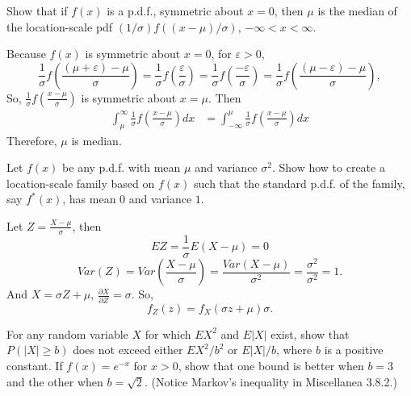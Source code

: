 \documentclass[14pt]{elegantbook}
\begin{document}
    \setcounter{exer}{36}
    \begin{exercise}
        Show that if $f(x)$ is a p.d.f., symmetric about $x=0$, then $\mu$ is the median of the location-scale pdf $(1/\sigma)f((x-\mu)/\sigma)$, $-\infty<x<\infty$. 
    \end{exercise}

    \begin{solution}
        Because $f(x)$ is symmetric about $x=0$, for $\varepsilon>0$, 
        \[
            \frac{1}{\sigma}f\left(\frac{(\mu+\varepsilon)-\mu}{\sigma}\right)=\frac{1}{\sigma}f\left(\frac{\varepsilon}{\sigma}\right)=\frac{1}{\sigma}f\left(\frac{-\varepsilon}{\sigma}\right)=\frac{1}{\sigma}f\left(\frac{(\mu-\varepsilon)-\mu}{\sigma}\right), 
        \]
        So, $\frac{1}{\sigma}f\left(\frac{x-\mu}{\sigma}\right)$ is symmetric about $x=\mu$. Then
        \begin{align*}
            \int_\mu^\infty \frac{1}{\sigma}f\left(\frac{x-\mu}{\sigma}\right)dx&=\int_{-\infty}^\mu \frac{1}{\sigma}f\left(\frac{x-\mu}{\sigma}\right)dx
        \end{align*}
        Therefore, $\mu$ is median. 
    \end{solution}

    \setcounter{exer}{39}
    \begin{exercise}
        Let $f(x)$ be any p.d.f. with mean $\mu$ and variance $\sigma^2$. Show how to create a location-scale family based on $f(x)$ such that the standard p.d.f. of the family, say $f^*(x)$, has mean $0$ and variance $1$.
    \end{exercise}

    \begin{solution}
        Let $Z=\frac{X-\mu}{\sigma}$, then
        \[EZ=\frac{1}{\sigma}E(X-\mu)=0\]
        \[Var(Z)=Var\left(\frac{X-\mu}{\sigma}\right)=\frac{Var(X-\mu)}{\sigma^2}=\frac{\sigma^2}{\sigma^2}=1. \]
        And $X=\sigma Z+\mu$, $\frac{\partial X}{\partial Z}=\sigma$. So, 
        \[
            f_Z(z)=f_X(\sigma z+\mu)\sigma. 
        \]
    \end{solution}

    \setcounter{exer}{43}
    \begin{exercise}
        For any random variable $X$ for which $EX^2$ and $E|X|$ exist, show that $P(|X|\geq b)$ does not exceed either $EX^2/b^2$ or $E|X|/b$, where $b$ is a positive constant. If $f(x)=e^{-x}$ for $x>0$, show that one bound is better when $b=3$ and the other when $b=\sqrt{2}$. (Notice Markov's inequality in Miscellanea 3.8.2.)
    \end{exercise}
\end{document}
